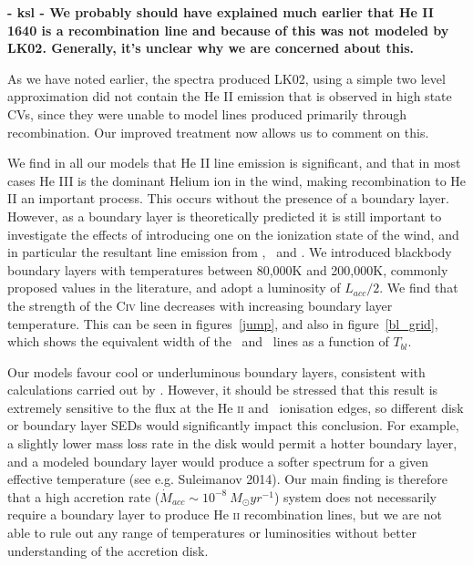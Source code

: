 \documentclass[preprint, a4paper, 11pt]{aastex}
\begin{document}
{{\bf - ksl - We probably should have explained much earlier that He II 1640 is a recombination line and 
because of this was not modeled by LK02.  Generally, it's unclear why we are concerned about this.}

As we have noted earlier, the spectra produced LK02, using a simple two level approximation did not contain the He II emission that is observed in high state CVs, since they were
unable to model lines produced primarily through recombination.  Our improved treatment now allows us to comment on this.

We find in all our models that He II line emission is significant, and that 
in most cases He  III is the dominant Helium ion in the wind, making recombination
to He II an important process. This occurs without the presence of a boundary 
layer. However, as a boundary layer is theoretically predicted 
it is still important to investigate the effects of introducing
one on the ionization state of the wind, and in particular
the resultant line emission from \heiiuv, \heiiopt\ and \civfull. 
We introduced blackbody boundary layers with temperatures between 80,000K and 200,000K,
commonly proposed values in the literature, and adopt a luminosity of
$L_{acc} / 2$. We find that the strength of the C\textsc{iv} line decreases
with increasing boundary layer temperature. This can be seen
in figures~\ref{jump}, and also in figure~\ref{bl_grid}, which
shows the equivalent width of the \civfull\ and \heiiuv\ lines as 
a function of $T_{bl}$.

Our models favour cool or underluminous boundary layers,
consistent with calculations carried out by
\cite{hoaredrew1993}. However,
it should be stressed that this result is extremely
sensitive to the flux at the He \textsc{ii} and \civ\ 
ionisation edges, so different disk or boundary layer
SEDs would significantly impact this conclusion.
For example, a slightly lower mass loss rate in the disk
would permit a hotter boundary layer, and a modeled boundary layer
would produce a softer spectrum for a given effective temperature
(see e.g. Suleimanov 2014). Our main finding
is therefore that a high accretion rate 
($\dot{M}_{acc} \sim 10^{-8}~M_{\odot}yr^{-1}$) 
system does not necessarily require a boundary layer to produce
He \textsc{ii} recombination lines, but we are not
able to rule out any range of temperatures or
luminosities without better understanding of
the accretion disk.


}
\end{document}
